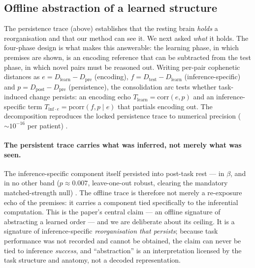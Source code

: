\documentclass[11pt]{article}
\begin{document}
\subsection{Offline abstraction of a learned structure}

The persistence trace (above) establishes that the resting brain \emph{holds} a
reorganisation and that our method can see it. We next asked \emph{what} it
holds. The four-phase design is what makes this answerable: the learning phase,
in which premises are shown, is an encoding reference that can be subtracted from
the test phase, in which novel pairs must be reasoned out. Writing per-pair
cophenetic distances as $e = D_{\text{learn}} - D_{\text{pre}}$ (encoding),
$f = D_{\text{test}} - D_{\text{learn}}$ (inference-specific) and
$p = D_{\text{post}} - D_{\text{pre}}$ (persistence), the consolidation arc tests
whether task-induced change persists: an encoding echo $T_{\text{learn}}=
\mathrm{corr}(e,p)$ and an inference-specific term $T_{\text{inf}\cdot e}=
\mathrm{pcorr}(f,p\mid e)$ that partials encoding out. The decomposition
reproduces the locked persistence trace to numerical precision
($\sim\!10^{-16}$ per patient)
.

\paragraph{The persistent trace carries what was inferred, not merely what was
seen.}
The inference-specific component itself persisted into post-task rest --- in
$\beta$, and in no other band ($p\approx0.007$, leave-one-out robust, clearing
the mandatory matched-strength null)
. The offline trace is therefore not merely a re-exposure echo of the premises:
it carries a component tied specifically to the inferential computation. This is
the paper's central claim --- an offline signature of abstracting a learned order
--- and we are deliberate about its ceiling. It is a signature of
inference-specific \emph{reorganisation that persists}; because task performance
was not recorded and cannot be obtained, the claim can never be tied to
inference \emph{success}, and ``abstraction'' is an interpretation licensed by
the task structure and anatomy, not a decoded representation.

\end{document}
